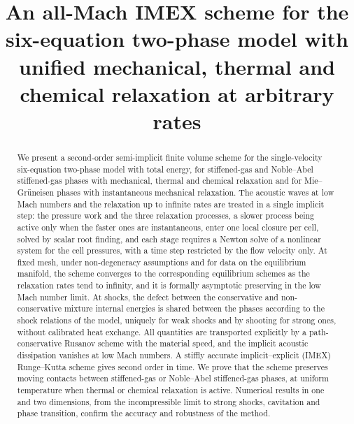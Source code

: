 
\title{An all-Mach IMEX scheme for the six-equation two-phase model with unified mechanical, thermal and chemical relaxation at arbitrary rates}

\begin{abstract}
We present a second-order semi-implicit finite volume scheme for the single-velocity six-equation two-phase model
with total energy, for stiffened-gas and Noble--Abel stiffened-gas phases with mechanical, thermal and chemical
relaxation and for Mie--Gr\"uneisen phases with instantaneous mechanical relaxation. The acoustic waves at low Mach
numbers and the relaxation up to infinite rates are treated in a single implicit step: the pressure work and the three
relaxation processes, a slower process being active only when the faster ones are instantaneous, enter one local
closure per cell, solved by scalar root finding, and each stage requires a Newton solve of a nonlinear system for the
cell pressures, with a time step restricted by the flow velocity only. At fixed mesh, under non-degeneracy
assumptions and for data on the equilibrium manifold, the scheme converges to the corresponding equilibrium schemes as the relaxation rates tend to infinity,
and it is formally asymptotic preserving in the low Mach number limit. At shocks, the defect between the conservative
and non-conservative mixture internal energies is shared between the phases according to the shock relations of the
model, uniquely for weak shocks and by shooting for strong ones, without calibrated heat exchange. All quantities are
transported explicitly by a path-conservative Rusanov scheme with the material speed, and the implicit acoustic
dissipation vanishes at low Mach numbers. A stiffly accurate implicit--explicit (IMEX) Runge--Kutta scheme gives
second order in time. We prove that the scheme preserves moving contacts between stiffened-gas or Noble--Abel
stiffened-gas phases, at uniform temperature when thermal or chemical relaxation is active. Numerical results in one
and two dimensions, from the incompressible limit to strong shocks, cavitation and phase transition, confirm the
accuracy and robustness of the method.
\end{abstract}

